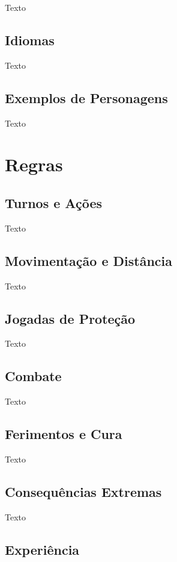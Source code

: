 \documentclass[a4paper, twocolumn, 10pt]{book}
\begin{document}
Texto

\section{Idiomas}

Texto

\section{Exemplos de Personagens}

Texto

\chapter{Regras}

\section{Turnos e Ações}

Texto

\section{Movimentação e Distância}

Texto

\section{Jogadas de Proteção}

Texto

\section{Combate}

Texto

\section{Ferimentos e Cura}

Texto

\section{Consequências Extremas}

Texto

\section{Experiência}
\end{document}
